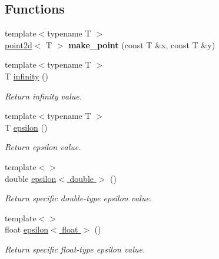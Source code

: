 \subsection*{Functions}
\begin{DoxyCompactItemize}
\item 
\mbox{\label{namespaceacme_ad33a71e74f2fb0963c2d73d9198c8b06}} 
{\footnotesize template$<$typename T $>$ }\\\hyperlink{classacme_1_1point2d}{point2d}$<$ T $>$ {\bfseries make\+\_\+point} (const T \&x, const T \&y)
\item 
\mbox{\label{namespaceacme_abaa8d891da65dcd3583b49a74a5070bf}} 
{\footnotesize template$<$typename T $>$ }\\T \hyperlink{namespaceacme_abaa8d891da65dcd3583b49a74a5070bf}{infinity} ()
\begin{DoxyCompactList}\small\item\em Return infinity value. \end{DoxyCompactList}\item 
\mbox{\label{namespaceacme_a271df552fb3ed0b0552ec753f179b086}} 
{\footnotesize template$<$typename T $>$ }\\T \hyperlink{namespaceacme_a271df552fb3ed0b0552ec753f179b086}{epsilon} ()
\begin{DoxyCompactList}\small\item\em Return epsilon value. \end{DoxyCompactList}\item 
\mbox{\label{namespaceacme_ac0dc78bf61c8c5c10b1825cf9e8c1290}} 
{\footnotesize template$<$$>$ }\\double \hyperlink{namespaceacme_ac0dc78bf61c8c5c10b1825cf9e8c1290}{epsilon$<$ double $>$} ()
\begin{DoxyCompactList}\small\item\em Return specific double-\/type epsilon value. \end{DoxyCompactList}\item 
\mbox{\label{namespaceacme_aa51a72841e708a201a31ddfe592b990f}} 
{\footnotesize template$<$$>$ }\\float \hyperlink{namespaceacme_aa51a72841e708a201a31ddfe592b990f}{epsilon$<$ float $>$} ()
\begin{DoxyCompactList}\small\item\em Return specific float-\/type epsilon value. \end{DoxyCompactList}\item 

\end{DoxyCompactItemize}
